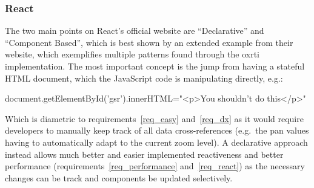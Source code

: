 \subsubsection*{React}
The two main points on React's official website are
  ``Declarative'' and ``Component Based''\cite*{noauthor_react_nodate}, which
  is best shown by an extended example from their website, which exemplifies
  multiple patterns found through the oxrti implementation. The most important
  concept is the jump from having a stateful HTML document, which the JavaScript
  code is manipulating directly, e.g.:
  \begin{typescript}
document.getElementById('gsr').innerHTML="<p>You shouldn't do this</p>"
\end{typescript}
Which is diametric to requirements~\ref{req_easy} and~\ref{req_dx} as it would
require developers to manually keep track of all data cross-references (e.g.\
the pan values having to automatically adapt to the current zoom level). A
declarative approach instead allows much better and easier implemented
reactiveness and better performance (requirements~\ref{req_performance}
and~\ref{req_react}) as the necessary changes can be track and components be
updated selectively.

